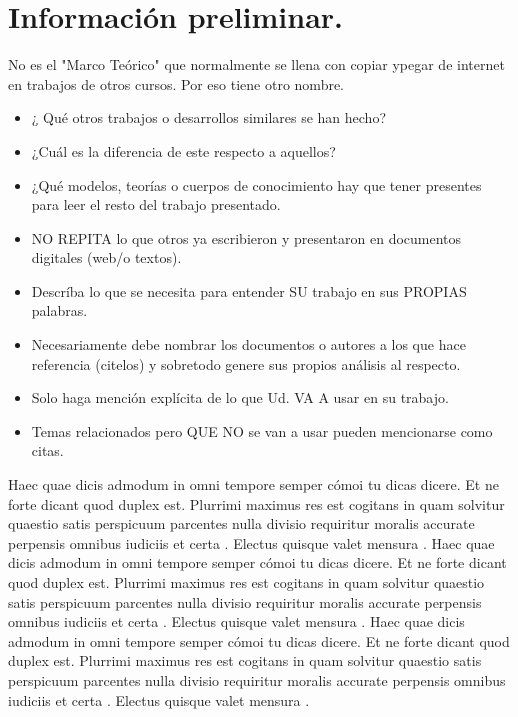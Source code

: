 \documentclass[10pt]{article}
\begin{document}
\cite{IEEEreferencias:Ref2}


\section{Información preliminar.}


No es el "Marco Teórico" que normalmente se llena con copiar ypegar de internet en trabajos de otros cursos. Por eso tiene otro nombre.

\begin{itemize}
\item  ¿ Qué otros trabajos o desarrollos similares se han hecho?
\item  ¿Cuál es la diferencia de este respecto a aquellos?
\item  ¿Qué modelos, teorías o cuerpos de conocimiento hay que tener presentes para leer el resto del trabajo presentado.
\item NO REPITA lo que otros ya escribieron y presentaron en documentos digitales (web/o textos). 

\item Descríba lo que se necesita para entender SU trabajo en sus PROPIAS palabras.
\item Necesariamente debe nombrar los documentos o autores a los que hace referencia (citelos) y sobretodo genere sus propios análisis al respecto.
\item Solo haga mención explícita de lo que Ud. VA A usar en su trabajo. 
\item Temas relacionados pero QUE NO se van a usar pueden mencionarse como citas.
\end{itemize}



Haec quae dicis admodum in omni tempore semper cómoi tu dicas dicere. Et ne forte dicant quod duplex est. Plurrimi maximus res est cogitans in quam solvitur quaestio satis perspicuum parcentes nulla divisio requiritur moralis accurate perpensis omnibus iudiciis et certa . Electus quisque valet mensura .
Haec quae dicis admodum in omni tempore semper cómoi tu dicas dicere. Et ne forte dicant quod duplex est. Plurrimi maximus res est cogitans in quam solvitur quaestio satis perspicuum parcentes nulla divisio requiritur moralis accurate perpensis omnibus iudiciis et certa . Electus quisque valet mensura .
Haec quae dicis admodum in omni tempore semper cómoi tu dicas dicere. Et ne forte dicant quod duplex est. Plurrimi maximus res est cogitans in quam solvitur quaestio satis perspicuum parcentes nulla divisio requiritur moralis accurate perpensis omnibus iudiciis et certa . Electus quisque valet mensura .
\end{document}
